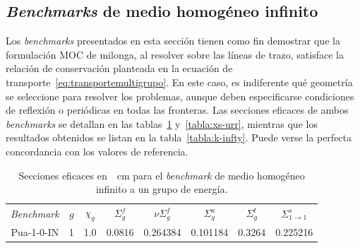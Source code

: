 \documentclass[11pt]{article}
\numberwithin{equation}{section}
\begin{document}
\subsection{\emph{Benchmarks} de medio homog\'eneo infinito}

Los \emph{benchmarks} presentados en esta sección tienen como fin demostrar que la formulación MOC de milonga, al resolver sobre las l\'ineas de trazo, satisface la relaci\'on de conservaci\'on planteada en la ecuación de transporte~\eqref{eq:transportemultigrupo}. En este caso, es indiferente qué geometr\'ia se seleccione para resolver los problemas, aunque deben especificarse condiciones de reflexión o periódicas en todas las fronteras. Las secciones eficaces de ambos \emph{benchmarks} se detallan en las tablas~\ref{tabla:xs-pua} y~\ref{tabla:xs-urr}, mientras que los resultados obtenidos se listan en la tabla~\ref{tabla:k-infty}. Puede verse la perfecta concordancia con los valores de referencia.

{
\begin{table}[ht!]
\begin{center}
\begin{tabular}{cccccccc}
\small \emph{Benchmark}  & \small $g$ & \small $\chi_g$ & \small $\Sigma^{f}_g$ & \small $\nu\Sigma^{f}_g$ & \small $\Sigma^{a}_g$ & \small $\Sigma^{t}_g$ & \small $\Sigma^s_{1 \rightarrow 1}$ \\
\small Pua-1-0-IN & \tiny \num{1} & \tiny \num{1.0} & \tiny \num{0.0816} & \tiny \num{0.264384} & \tiny \num{0.101184} & \tiny \num{0.3264} & \tiny \num{0.225216}
\end{tabular}
\caption{\label{tabla:xs-pua} Secciones eficaces en~\si{\per\centi\metre} para el \emph{benchmark} de medio homogéneo infinito a un grupo de energía.}
\end{center}
\end{table}
}
\end{document}
